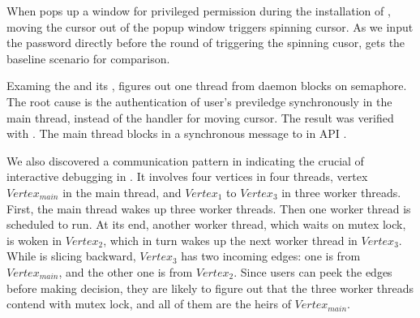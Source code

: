 When  pops up a window for privileged permission during the
installation of , moving the cursor out of the popup
window triggers spinning cursor. As we input the password directly before the
round of triggering the spinning cusor, \xxx gets the baseline scenario for
comparison.

Examing the \spinningnode and its \similarnode, \xxx figures out one thread from
daemon  blocks on semaphore. The root cause is the authentication
of user's previledge synchronously in the main thread, instead of the handler
for moving cursor. The result was verified with . The main thread
blocks in a synchronous message to  in API .


We also discovered a communication pattern in  indicating the
crucial of interactive debugging in \xxx. It involves four vertices in four
threads, vertex $Vertex_{main}$ in the main thread, and $Vertex_1$ to $Vertex_3$
in three worker threads. First, the main thread wakes up three worker threads.
Then one worker thread is scheduled to run. At its end, another worker thread,
which waits on mutex lock, is woken in $Vertex_2$, which in turn wakes up the
next worker thread in $Vertex_3$. While \xxx is slicing backward, $Vertex_3$
has two incoming edges: one is from $Vertex_{main}$, and the other one is from
$Vertex_2$. Since users can peek the edges before making decision, they are
likely to figure out that the three worker threads contend with mutex lock, and
all of them are the heirs of $Vertex_{main}$.
